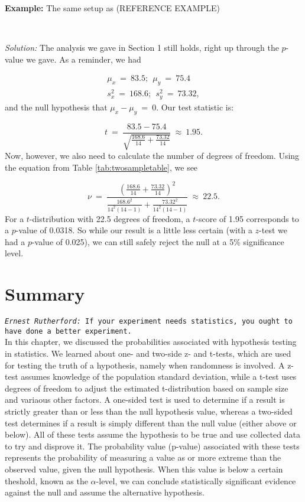 \textbf{Example:}  The same setup as (REFERENCE EXAMPLE)

~

\emph{Solution:}  The analysis we gave in Section 1 still holds, right up through the $p$-value we gave. As a reminder, we had

\begin{eqnarray}
\mu_x\ = \ 83.5;\ \ \mu_y\ = \ 75.4 \nonumber\\ s^2_x\ = \ 168.6;\ \ s^2_y\ = \ 73.32,
\end{eqnarray}
and the null hypothesis that $\mu_x - \mu_y\ = \ 0$.  Our test statistic is:

\begin{equation*}
t\ = \ \frac{83.5-75.4}{\sqrt{\frac{168.6}{14}+\frac{73.32}{14}}}\ \approx \ 1.95.
\end{equation*}
Now, however, we also need to calculate the number of degrees of freedom.  Using the equation from Table \ref{tab:twosampletable}, we see

\begin{equation*}
\nu\ = \ \frac{\left(\frac{168.6}{14} + \frac{73.32}{14}\right)^2}{\frac{168.6^2}{14^2\left(14 - 1\right)} + \frac{73.32^2}{14^2\left(14 - 1\right)}}\ \approx \ 22.5.
\end{equation*}
For a $t$-distribution with 22.5 degrees of freedom, a $t$-score of 1.95 corresponds to a $p$-value of 0.0318.  So while our result is a little less certain (with a $z$-test we had a $p$-value of 0.025), we can still safely reject the null at a 5\% significance level.


\section{Summary}

\noindent \texttt{\emph{Ernest Rutherford:} If your experiment needs statistics, you ought to have done a better experiment.} \\

In this chapter, we discussed the probabilities associated with hypothesis testing in statistics. We learned about one- and two-side z- and t-tests, which are used for testing the truth of a hypothesis, namely when randomness is involved. A z-test assumes knowledge of the population standard deviation, while a t-test uses degrees of freedom to adjust the estimated t-distribution based on sample size and variaous other factors. A one-sided test is used to determine if a result is strictly greater than or less than the null hypothesis value, whereas a two-sided test determines if a result is simply different than the null value (either above or below). All of these tests assume the hypothesis to be true and use collected data to try and disprove it. The probability value (p-value) associated with these tests represents the probability of measuring a value as or more extreme than the observed value, given the null hypothesis. When this value is below a certain theshold, known as the $\alpha$-level, we can conclude statistically significant evidence against the null and assume the alternative hypothesis. 

